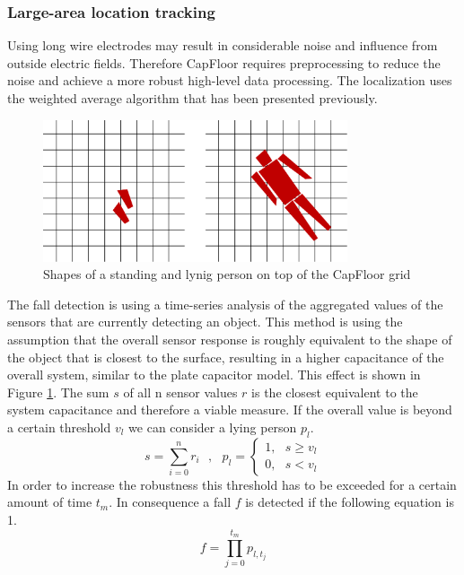 \subsubsection{Large-area location tracking}
Using long wire electrodes may result in considerable noise and influence from outside electric fields. Therefore CapFloor requires preprocessing to reduce the noise and achieve a more robust high-level data processing. The localization uses the weighted average algorithm that has been presented previously. 
\begin{figure}[h]
\centering
\includegraphics[width=0.8\textwidth]{images/floor_shapes}
\caption{Shapes of a standing and lynig person on top of the CapFloor grid}
\label{fig:capfloor_shapes}
\end{figure}
The fall detection is using a time-series analysis of the aggregated values of the sensors that are currently detecting an object. This method is using the assumption that the overall sensor response is roughly equivalent to the shape of the object that is closest to the surface, resulting in a higher capacitance of the overall system, similar to the plate capacitor model. This effect is shown in Figure \ref{fig:capfloor_shapes}. The sum $s$ of all n sensor values $r$ is the closest equivalent to the system capacitance and therefore a viable measure. If the overall value is beyond a certain threshold $v_l$ we can consider a lying person $p_l$.
\begin{equation}
s=\sum^n_{i=0}{r_i}\ \ \ ,\ \ \ p_l=\left\{ \begin{array}{c}
1,\ \ \ s\ge v_l \\ 
0,\ \ \ s<v_l \end{array}
\right.
\end{equation}
In order to increase the robustness this threshold has to be exceeded for a certain amount of time $t_m$. In consequence a fall $f$ is detected if the following equation is 1.
\begin{equation}
f=\prod^{t_m}_{j=0}{p_{l,t_j}}
\end{equation}